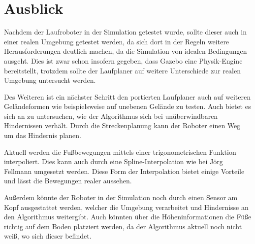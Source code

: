 \chapter{Ausblick}
\label{kap8}

Nachdem der Laufroboter in der Simulation getestet wurde, sollte dieser auch in einer realen Umgebung getestet werden, da sich dort in der Regeln weitere Herausforderungen deutlich machen, da die Simulation von idealen Bedingungen ausgeht. Dies ist zwar schon insofern gegeben, dass Gazebo eine Physik-Engine bereitstellt, trotzdem sollte der Laufplaner auf weitere Unterschiede zur realen Umgebung untersucht werden.

Des Weiteren ist ein nächster Schritt den portierten Laufplaner auch auf weiteren Geländeformen wie beispielsweise auf unebenen Gelände zu testen.  Auch bietet es sich an zu untersuchen, wie der Algorithmus sich bei unüberwindbaren Hindernissen verhält. Durch die Streckenplanung kann der Roboter einen Weg um das Hindernis planen.

Aktuell werden die Fußbewegungen mittels einer trigonometrischen Funktion interpoliert. Dies kann auch durch eine Spline-Interpolation wie bei Jörg Fellmann \autocite{fellmann2007} umgesetzt werden. Diese Form der Interpolation bietet einige Vorteile und lässt die Bewegungen realer aussehen.

Außerdem könnte der Roboter in der Simulation noch durch einen Sensor am Kopf ausgestattet werden, welcher die Umgebung verarbeitet und Hindernisse an den Algorithmus weitergibt. Auch könnten über die Höheninformationen die Füße richtig auf dem Boden platziert werden, da der Algorithmus aktuell noch nicht weiß, wo sich dieser befindet.